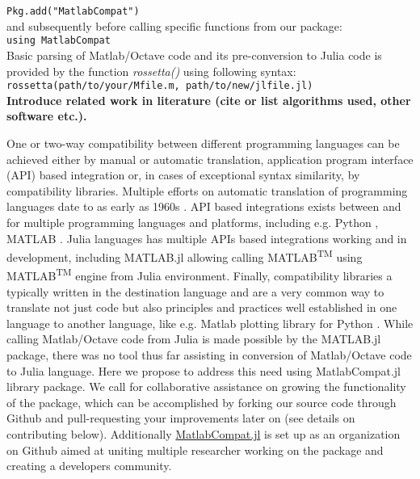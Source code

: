 \verb|Pkg.add("MatlabCompat")|\\

and subsequently before calling specific functions from our package:\\

\verb|using MatlabCompat|\\

Basic parsing of Matlab/Octave code and its pre-conversion to Julia code is provided by the function \textit{rossetta()} using following syntax:\\

\verb|rossetta(path/to/your/Mfile.m, path/to/new/jlfile.jl)|\\

\textbf{Introduce related work in literature (cite or list algorithms used, other software etc.).}

One or two-way compatibility between different programming languages can be achieved either by manual or automatic translation, application program interface (API) based integration or, in cases of exceptional syntax similarity, by compatibility libraries. Multiple efforts on automatic translation of programming languages date to as early as 1960s \cite{Ledley_1962, irons1961syntax}. API based integrations exists between and for multiple programming languages and platforms, including e.g. Python \cite{autin2012upy}, MATLAB \cite{Bornstein_2008}. Julia languages has multiple APIs based integrations working and in development, including MATLAB.jl allowing calling MATLAB\textsuperscript{TM} using MATLAB\textsuperscript{TM} engine from Julia environment. Finally, compatibility libraries a typically written in the destination language and are a very common way to translate not just code but also principles and practices well established in one language to another language, like e.g. Matlab plotting library for Python \cite{Hunter_2007, barrett2005matplotlib}. While calling Matlab/Octave code from Julia is made possible by the MATLAB.jl package, there was no tool thus far assisting in conversion of Matlab/Octave 
code to Julia language. Here we propose to address this need using MatlabCompat.jl library package. We call for collaborative assistance on growing the functionality of the package, which can be accomplished by forking our source code through Github and pull-requesting your improvements later on (see details on contributing below). Additionally \href{http://matlabcompat.github.io/}{MatlabCompat.jl} is set up as an organization on Github aimed at uniting multiple researcher working on the package and creating a developers community.
    
    
    
    
    
    
    
    
    
    
    
    
    
    
    
    
  
  
  
  
  
  
  
  
  
  
  
  
  
  
  
  
  
  
  
  